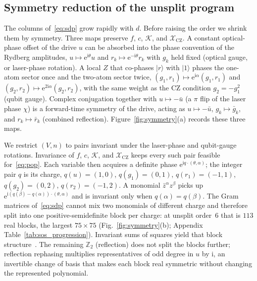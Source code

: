 \documentclass[aps,prx,reprint,nofootinbib,longbibliography,floatfix]{revtex4-2}
\theoremstyle{plain}
\theoremstyle{remark}
\newcommand{\ee}{\mathrm{e}}
\newcommand{\ii}{\mathrm{i}}
\newcommand{\bket}[1]{|#1\rangle}
\begin{document}
\subsection{Symmetry reduction of the unsplit program}
\label{sec:sos_reductions}

The columns of~\eqref{eq:sdp} grow rapidly with $d$. Before raising the
order we shrink them by symmetry. Three maps preserve $f$, $c$,
$\mathcal K$, and $\mathcal{X}_{\mathrm{CZ}}$. A constant optical-phase
offset of the drive $u$ can be absorbed into the phase convention of the
Rydberg amplitudes, $u\mapsto\ee^{\ii\theta}u$ and
$r_k\mapsto\ee^{-\ii\theta}r_k$ with $g_k$ held fixed (optical gauge, or
laser-phase rotation). A local $Z$ that co-phases $\bket{r}$ with
$\bket{1}$ phases the one-atom sector once and the two-atom sector twice,
$(g_1,r_1)\mapsto\ee^{\ii\alpha}(g_1,r_1)$ and
$(g_2,r_2)\mapsto\ee^{2\ii\alpha}(g_2,r_2)$, with the same weight as the
CZ condition $g_2=-g_1^2$ (qubit gauge). Complex conjugation together
with $u\mapsto-\bar u$ (a $\pi$ flip of the laser phase $\chi$) is a
forward-time symmetry of the drive, acting as $u\mapsto-\bar u$,
$g_k\mapsto\bar g_k$, and $r_k\mapsto\bar r_k$ (combined reflection).
Figure~\ref{fig:symmetry}(a) records these three maps.

We restrict $(V,n)$ to pairs invariant under
the laser-phase and qubit-gauge rotations.
Invariance of $f$, $c$, $\mathcal K$, and $\mathcal{X}_{\mathrm{CZ}}$
keeps every such pair feasible for~\eqref{eq:pop}. Each variable then acquires a
definite phase $\ee^{\ii q\cdot(\theta,\alpha)}$; the integer pair $q$ is
its charge, $q(u)=(1,0)$, $q(g_1)=(0,1)$, $q(r_1)=(-1,1)$,
$q(g_2)=(0,2)$, $q(r_2)=(-1,2)$. A monomial $\bar z^\alpha z^\beta$ picks
up $\ee^{\ii(q(\beta)-q(\alpha))\cdot(\theta,\alpha)}$ and is invariant
only when $q(\alpha)=q(\beta)$. The Gram matrices of~\eqref{eq:sdp}
cannot mix two monomials of different charge and therefore split into one
positive-semidefinite block per charge: at unsplit order~$6$ that is
$113$ real blocks, the largest $75\times75$
(Fig.~\ref{fig:symmetry}(b); Appendix Table~\ref{tab:sos_progression}).
Invariant sums of squares yield that block
structure~\cite{Gatermann04,Riener13}. The remaining $\mathbb{Z}_2$
(reflection) does not split the blocks further; reflection rephasing
multiplies representatives of odd degree in $u$ by $\ii$, an
invertible change of basis that makes each block real symmetric without
changing the represented polynomial.
\end{document}
